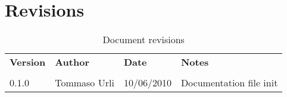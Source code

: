 \section{Revisions}

\begin{table}[h]
  \label{tab:revisioni}
  \begin{tabular}{llll}
    \textbf{Version} & \textbf{Author} & \textbf{Date} & \textbf{Notes}\\
    \\
    0.1.0 & Tommaso Urli & 10/06/2010 & Documentation file init\\

  \end{tabular}
  \caption{Document revisions}
\end{table}

